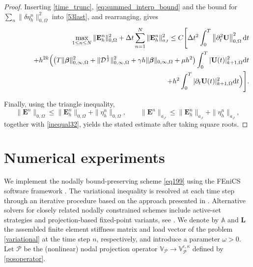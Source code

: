 \documentclass[final,12pt]{amsart}
\theoremstyle{plain}
\theoremstyle{definition}
\newcommand\bbeta{{\boldsymbol{\beta}}}
\newcommand\calP{{\mathcal{P}}}
\newcommand\bE{\mathbf{E}}
\begin{document}
\begin{proof}
Inserting \eqref{time_trunc}, \eqref{eq:summed_interp_bound} and the bound for $\sum_n\|\delta\eta_h^n\|_{0,\Omega}^2$ into \eqref{53last}, and rearranging, gives
\begin{equation}
	\begin{aligned}
		\max_{1\leq n\leq N}\|\bE_h^n \|_{0,\Omega}^2+\Delta t\sum_{n=1}^{N}\|\bE_h^n \|_{a_{J}}^2
		\leq C\Bigg[
		\Delta t^{2}\int_{0}^{T} \left\|\partial_{t}^{2}\mathbf{U}\right\|_{0,\Omega}^2 {\rm d}t\\
		\qquad\qquad
		+h^{2k}\Big(\big(T\|\bbeta\|_{0,\infty,\Omega}^{2}+\|\mathcal{D}^{\frac{1}{2}}\|_{0,\infty,\Omega}^{2}+\gamma h\|\bbeta\|_{0,\infty,\Omega}+\mu h^{2}\big)\int_{0}^{T}|\mathbf{U}(t)|_{k+1,\Omega}^{2}{\rm d}t\\
		\qquad\qquad\qquad\qquad
		+h^{2}\int_{0}^{T}|\partial_{t}\mathbf{U}(t)|_{k+1,\Omega}^{2}{\rm d}t\Big)\Bigg].
	\end{aligned}
\end{equation}

Finally, using the triangle inequality,
\[
	\|\bE^n\|_{0,\Omega} \le \|\bE_h^n\|_{0,\Omega}+\|\eta_h^n\|_{0,\Omega},
	\qquad
	\|\bE^n\|_{a_J} \le \|\bE_h^n\|_{a_J}+\|\eta_h^n\|_{a_J},
\]
together with \eqref{inequal32}, yields the stated estimate after taking square roots.
\end{proof}


\section{Numerical experiments}\label{sec:numerics}

We implement the nodally bound-preserving scheme \eqref{eq199} using the FEniCS software framework \cite{fenicsx2023, dolfinx2023}. The variational inequality is resolved at each time step through an iterative procedure based on the approach presented in \cite{Kor76}.  Alternative solvers for closely related nodally constrained schemes include active-set strategies and projection-based fixed-point variants, see \cite{ashby2025nodally,barrenechea2025nodally}.
We denote by $\mathbb{A}$ and $\mathbf{L}$ the assembled finite element stiffness matrix and load vector of the problem \eqref{variational} at the time step $n$, respectively, and introduce a parameter $\omega > 0$. Let $\mathcal{P}$ be the (nonlinear) nodal projection operator $\mathbb{V}_\calP^{}\to \mathbb{V}_{\calP}^{\epsilon,\kappa}$ defined by \eqref{posoperator}.
\end{document}
